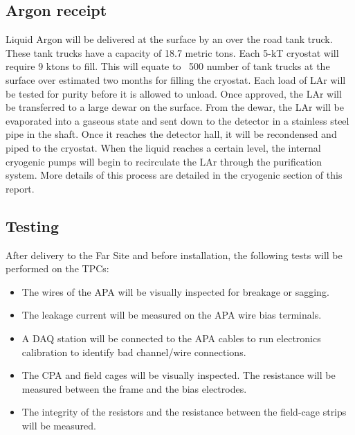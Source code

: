 \subsection{Argon receipt}
\label{fd:install:Argon receipt (Fowler)}

Liquid Argon will be delivered at the surface by an over the road tank truck.  These tank trucks have a capacity of 18.7 metric tons.  Each 5-kT cryostat will require 9 ktons to fill.  This will equate to ~500 number of tank trucks at the surface over estimated two months for filling the cryostat.  Each load of LAr will be tested for purity before it is allowed to unload.  Once approved, the LAr will be transferred to a large dewar on the surface.  From the dewar, the LAr will be evaporated into a gaseous state and sent down to the detector in a stainless steel pipe in the shaft.  Once it reaches the detector hall, it will be recondensed and piped to the cryostat.  When the liquid reaches a certain level, the internal cryogenic pumps will begin to recirculate the LAr through the purification system.  More details of this process are detailed in the cryogenic section of this report.



\subsection{Testing}
\label{fd:install:testing}

After delivery to the Far Site and before installation, the following tests will be performed on the TPCs: 
\begin{itemize}
\item The wires of the APA will be visually inspected for breakage or sagging. 
\item The leakage current will be measured on the APA wire bias terminals. 
\item A DAQ station will be connected to the APA cables to run electronics calibration to identify bad channel/wire connections. 
\item The CPA and field cages will be visually inspected. The resistance will be measured between the frame and the bias electrodes. 
\item The integrity of the resistors and the resistance between the field-cage strips will be measured. 
\end{itemize}

